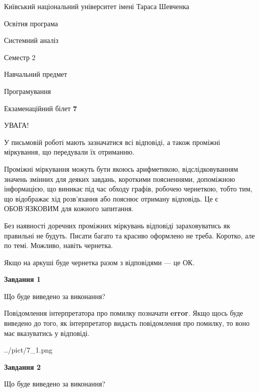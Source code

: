 \documentclass[12pt, ukrainian]{article}
\begin{document}
{{\begin {small}\par
{ \center  Київський національний університет імені Тараса Шевченка \par}
{\parbox {5 cm}{Освітня програма \hfill}{\parbox {7 cm}{Системний аналіз \hfill}}\parbox {6 cm}{\hfill Семестр 2}}\par
{\parbox {5 cm} {Навчальний предмет \hfill}\parbox {7 cm}{Програмування \hfill}\parbox {6cm}{\hfill}\par}\vspace{-7pt} \end{small}}{\center Екзаменаційний білет \No \textbf
{ 7 }\par}}
{
\begin {large}
УВАГА!

У письмовій роботі мають зазначатися всі відповіді, а також проміжні міркування, що передували їх отриманню.

Проміжні міркування можуть бути якоюсь арифметикою, відслідковуванням зна\-чень змінних для деяких завдань,
короткими поясненнями, допоміжною інформацією, що виникає під час обходу графів, робочею чернеткою,
тобто тим, що відображає хід розв’язання або пояснює отриману відповідь.
Це є ОБОВ’ЯЗКОВИМ для кожного запитання.

Без наявності доречних проміжних міркувань відповіді зараховуватись як правиль\-ні не будуть.
Писати багато та красиво оформлено не треба. Коротко, але по темі. Можли\-во, навіть чернетка.

Якщо на аркуші буде чернетка разом з відповідями --- це ОК.

\newpage

{\begin {center}\textbf{Завдання 1}\end {center}}\par
Що буде виведено за виконання?

Повідомлення інтерпретатора про помилку позначати \textbf{error}.
Якщо щось буде виведено до того, як інтерпретатор видасть повідомлення про помилку, 
то воно має вказуватись у відповіді. \par


\begin{center}
	{../pict/7_1.png}
\end{center}
\newpage

{\begin {center}\textbf{Завдання 2}\end {center}}\par
Що буде виведено за виконання?


\end{large}}
\end{document}
